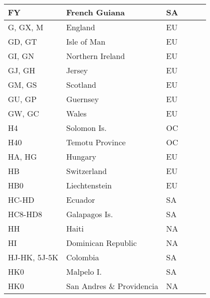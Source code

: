\documentclass[a4paper]{article}
\begin{document}
\begin{longtable}{|p{1.5cm}|p{4cm}|l|p{2cm}|p{2cm}|p{2cm}|}
\hline
FY                     & French Guiana                              & SA    & & & \\
\hline
G, GX, M               & England                                    & EU    & & & \\
\hline
GD, GT                 & Isle of Man                                & EU    & & & \\
\hline
GI, GN                 & Northern Ireland                           & EU    & & & \\
\hline
GJ, GH                 & Jersey                                     & EU    & & & \\
\hline
GM, GS                 & Scotland                                   & EU    & & & \\
\hline
GU, GP                 & Guernsey                                   & EU    & & & \\
\hline
GW, GC                 & Wales                                      & EU    & & & \\
\hline
H4                     & Solomon Is.                                & OC    & & & \\
\hline
H40                    & Temotu Province                            & OC    & & & \\
\hline
HA, HG                 & Hungary                                    & EU    & & & \\
\hline
HB                     & Switzerland                                & EU    & & & \\
\hline
HB0                    & Liechtenstein                              & EU    & & & \\
\hline
HC-HD                  & Ecuador                                    & SA    & & & \\
\hline
HC8-HD8                & Galapagos Is.                              & SA    & & & \\
\hline
HH                     & Haiti                                      & NA    & & & \\
\hline
HI                     & Dominican Republic                         & NA    & & & \\
\hline
HJ-HK, 5J-5K           & Colombia                                   & SA    & & & \\
\hline
HK0                    & Malpelo I.                                 & SA    & & & \\
\hline
HK0                    & San Andres \& Providencia                  & NA    & & & \\

\end{longtable}
\end{document}
